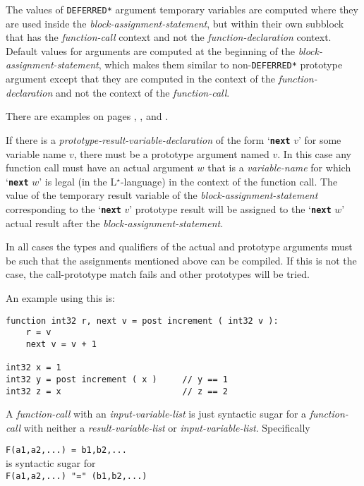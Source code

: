 \documentclass[12pt]{article}
\newcommand{\LSTAR}{L$^\star$}
\newcommand{\TT}[1]{{\tt \bfseries #1}}
\newenvironment{indpar}[1][0.3in]%
	{\begin{list}{}%
		     {\setlength{\itemsep}{0in}%
		      \setlength{\topsep}{0in}%
		      \setlength{\parsep}{1ex}%
		      \setlength{\labelwidth}{#1}%
		      \setlength{\leftmargin}{#1}%
		      \addtolength{\leftmargin}{\labelsep}}%
	 \item}%
	{\end{list}}
\begin{document}
The values of {\tt *DEFERRED*}
argument temporary variables are computed where they are used
inside the {\em block-assignment-statement},
but within their own subblock that has the
{\em function-call} context and not the {\em function-declaration}
context.
Default values for arguments are computed
at the beginning of the {\em block-assignment-statement}, which makes them similar to
non-{\tt *DEFERRED*} prototype argument except that they are computed
in the context of the {\em function-declaration} and not the context
of the {\em function-call}.

There are examples on pages \pageref{AND-EXAMPLE}, \pageref{IF-ELSE-EXAMPLE},
and \pageref{COMPARE-EXAMPLE}.

If there is a {\em prototype-result-variable-declaration}
of the form `\TT{next} $v$' for some variable name $v$, there must
be a prototype
argument named $v$.
In this case any function call must have an actual argument $w$ that
is a {\em variable-name} for which `\TT{next} $w$' is legal
(in the \LSTAR-language) in the context
of the function call.  The value of the temporary result variable of the
{\em block-assignment-statement} corresponding to the `\TT{next} $v$'
prototype result will be assigned to the `\TT{next} $w$' actual result
after the {\em block-assignment-statement}.

In all cases the types and qualifiers of the actual and prototype
arguments must be such that the assignments mentioned above can
be compiled.  If this is not the case, the call-prototype match
fails and other prototypes will be tried.

An example using this is:
\begin{indpar}\begin{verbatim}
function int32 r, next v = post increment ( int32 v ):
    r = v
    next v = v + 1

int32 x = 1
int32 y = post increment ( x )     // y == 1
int32 z = x                        // z == 2
\end{verbatim}\end{indpar}

A {\em function-call} with an {\em input-variable-list} is just syntactic
sugar for a {\em function-call} with neither a {\em result-variable-list}
or {\em input-variable-list}.  Specifically
\begin{center}
{\tt F(a1,a2,...)~=~b1,b2,...} \\
is syntactic sugar for \\
{\tt F(a1,a2,...)~"="~(b1,b2,...)} \\
\end{center}
\end{document}
